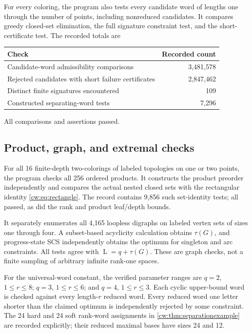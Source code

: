 \documentclass[11pt,letterpaper]{article}
\numberwithin{equation}{section}
\theoremstyle{definition}
\theoremstyle{remark}
\theoremstyle{definition}
\newcommand{\layers}{\operatorname{L}}
\begin{document}
For every coloring, the program also tests every candidate word of lengths
one through the number of points, including nonreduced candidates. It
compares greedy closed-set elimination, the full signature constraint test,
and the short-certificate test. The recorded totals are
\begin{center}
\begin{tabular}{@{}lr@{}}
\toprule
Check & Recorded count\\
\midrule
Candidate-word admissibility comparisons & 3,481,578\\
Rejected candidates with short failure certificates & 2,847,462\\
Distinct finite signatures encountered & 109\\
Constructed separating-word tests & 7,296\\
\bottomrule
\end{tabular}
\end{center}
All comparisons and assertions passed.

\subsection{Product, graph, and extremal checks}

For all 16 finite-depth two-colorings of labeled topologies on one or two
points, the program checks all 256 ordered products. It constructs the
product preorder independently and compares the actual nested closed sets
with the rectangular identity \eqref{cw:eq:rectangle}. The record contains
9,856 such set-identity tests; all passed, as did the rank and product
leaf/depth bounds.

It separately enumerates all 4,165 loopless digraphs on labeled vertex sets
of sizes one through four. A subset-based acyclicity calculation obtains
$\tau(G)$, and progress-state SCS independently obtains the optimum for
singleton and arc constraints. All tests agree with $\layers=q+\tau(G)$.
These are graph checks, not a finite sampling of arbitrary infinite
rank-one spaces.

For the universal-word constant, the verified parameter ranges are
$q=2$, $1\le r\le8$; $q=3$, $1\le r\le6$; and $q=4$,
$1\le r\le3$. Each cyclic upper-bound word is checked against every
length-$r$ reduced word. Every reduced word one letter shorter than the
claimed optimum is independently rejected by some constraint.
The 24 hard and 24 soft rank-word assignments in
\cref{cw:thm:separationexample} are recorded explicitly; their reduced maximal
bases have sizes 24 and 12.
\end{document}
